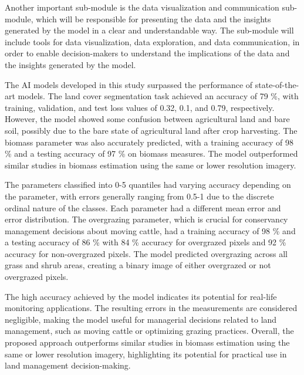 \documentclass[draft, {\secondLanguage}, english]{volcanica-template}
\begin{document}
Another important sub-module is the data visualization and communication sub-module, which will be responsible for presenting the data and the insights generated by the model in a clear and understandable way. The sub-module will include tools for data visualization, data exploration, and data communication, in order to enable decision-makers to understand the implications of the data and the insights generated by the model.


The AI models developed in this study surpassed the performance of state-of-the-art models. The land cover segmentation task achieved an accuracy of 79 \%, with training, validation, and test loss values of 0.32, 0.1, and 0.79, respectively. However, the model showed some confusion between agricultural land and bare soil, possibly due to the bare state of agricultural land after crop harvesting. The biomass parameter was also accurately predicted, with a training accuracy of 98 \% and a testing accuracy of 97 \% on biomass measures. The model outperformed similar studies in biomass estimation using the same or lower resolution imagery.

The parameters classified into 0-5 quantiles had varying accuracy depending on the parameter, with errors generally ranging from 0.5-1 due to the discrete ordinal nature of the classes. Each parameter had a different mean error and error distribution. The overgrazing parameter, which is crucial for conservancy management decisions about moving cattle, had a training accuracy of 98 \% and a testing accuracy of 86 \% with 84 \% accuracy for overgrazed pixels and 92 \% accuracy for non-overgrazed pixels. The model predicted overgrazing across all grass and shrub areas, creating a binary image of either overgrazed or not overgrazed pixels.

The high accuracy achieved by the model indicates its potential for real-life monitoring applications. The resulting errors in the measurements are considered negligible, making the model useful for managerial decisions related to land management, such as moving cattle or optimizing grazing practices. Overall, the proposed approach outperforms similar studies in biomass estimation using the same or lower resolution imagery, highlighting its potential for practical use in land management decision-making.
\end{document}
